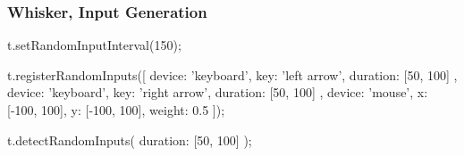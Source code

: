 \begin{frame}[fragile]\frametitle{Whisker, Input Generation}
    \begin{javascriptcode}
        t.setRandomInputInterval(150);

        t.registerRandomInputs([
          { device: 'keyboard', key: 'left arrow', duration: [50, 100] },
          { device: 'keyboard', key: 'right arrow', duration: [50, 100] },
          { device: 'mouse', x: [-100, 100], y: [-100, 100], weight: 0.5 }
        ]);

        t.detectRandomInputs({ duration: [50, 100] });
    \end{javascriptcode}
\end{frame}

